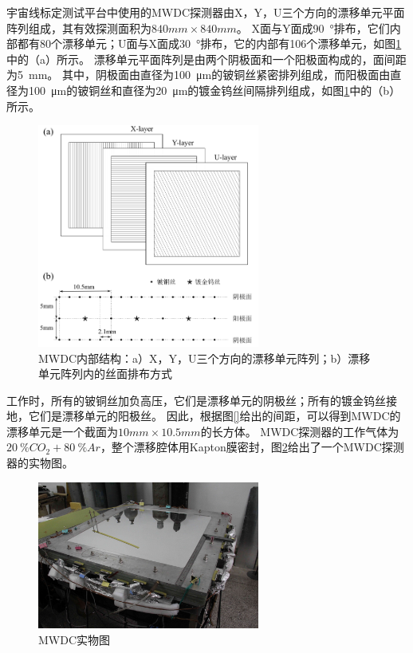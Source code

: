 宇宙线标定测试平台中使用的MWDC探测器由X，Y，U三个方向的漂移单元平面阵列组成，其有效探测面积为$840mm \times 840mm$。
X面与Y面成\SI{90}{\degree}排布，它们内部都有80个漂移单元；U面与X面成\SI{30}{\degree}排布，它的内部有106个漂移单元，如图\ref{fig:cosmic_ray:mwdc_schematic}中的（a）所示。
漂移单元平面阵列是由两个阴极面和一个阳极面构成的，面间距为\SI{5}{mm}。
其中，阴极面由直径为\SI{100}{\micro\meter}的铍铜丝紧密排列组成，而阳极面由直径为\SI{100}{\micro\meter}的铍铜丝和直径为\SI{20}{\micro\meter}的镀金钨丝间隔排列组成，如图\ref{fig:cosmic_ray:mwdc_schematic}中的（b）所示。
\begin{figure}[htb]
\centering
\includegraphics[width=0.65\textwidth]{chap/cosmic_ray/fig/mwdc_schematic.png}
\caption{MWDC内部结构：a）X，Y，U三个方向的漂移单元阵列；b）漂移单元阵列内的丝面排布方式}
\label{fig:cosmic_ray:mwdc_schematic}
\end{figure}
工作时，所有的铍铜丝加负高压，它们是漂移单元的阴极丝；所有的镀金钨丝接地，它们是漂移单元的阳极丝。
因此，根据图\ref{}给出的间距，可以得到MWDC的漂移单元是一个截面为$10mm\times 10.5mm$的长方体。
MWDC探测器的工作气体为$\SI{20}{\percent}CO_2 + \SI{80}{\percent}Ar$，整个漂移腔体用Kapton膜密封，图\ref{fig:cosmic_ray:mwdc}给出了一个MWDC探测器的实物图。
\begin{figure}[htbp]
	\centering
	\includegraphics[width=0.65\textwidth]{chap/cosmic_ray/fig/mwdc.jpg}
	\caption{MWDC实物图}
	\label{fig:cosmic_ray:mwdc}
\end{figure}

